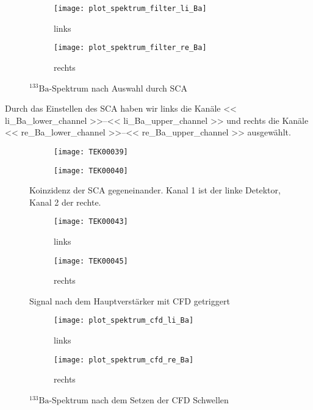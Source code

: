 \documentclass[11pt, ngerman, fleqn, DIV=15, headinclude, BCOR=2cm]{scrreprt}
\begin{document}
\begin{figure}
	\centering
	\begin{subfigure}{0.49 \textwidth}
		\texttt{[image: plot\_spektrum\_filter\_li\_Ba]}
		\caption{%
			links
		}
		\label{fig:ba_slow_sca_eingestellt-li_plot}
	\end{subfigure}
	\begin{subfigure}{0.49 \textwidth}
		\texttt{[image: plot\_spektrum\_filter\_re\_Ba]}
		\caption{%
			rechts
		}
		\label{fig:ba_slow_sca_eingestellt-re_plot}
	\end{subfigure}
	\caption{%
		$^{133}\text{Ba}$-Spektrum nach Auswahl durch SCA
	}
	\label{fig:ba_slow_signal_sca_eingestellt_plot}
\end{figure}

Durch das Einstellen des SCA haben wir links die Kanäle
\numrange{<< li_Ba_lower_channel >>}{<< li_Ba_upper_channel >>} und rechts
die Kanäle
\numrange{<< re_Ba_lower_channel >>}{<< re_Ba_upper_channel >>} ausgewählt.


\begin{figure}
	\centering
	\begin{subfigure}{0.49 \textwidth}
		\texttt{[image: TEK00039]}
	\end{subfigure}
	\begin{subfigure}{0.49 \textwidth}
		\texttt{[image: TEK00040]}
	\end{subfigure}
	\caption{%
		Koinzidenz der SCA gegeneinander. Kanal 1 ist der linke
		Detektor, Kanal 2 der rechte.
	}
	\label{fig:ba_slow_signal_sca_koinzidenz}
\end{figure}



\begin{figure}
	\centering
	\begin{subfigure}{0.49 \textwidth}
		\texttt{[image: TEK00043]}
		\caption{%
			links
		}
		\label{fig:ba_fast_signal_cfd_trig-li}
	\end{subfigure}
	\begin{subfigure}{0.49 \textwidth}
		\texttt{[image: TEK00045]}
		\caption{%
			rechts
		}
		\label{fig:ba_fast_signal_cfd_trig-re}
	\end{subfigure}
	\caption{%
		Signal nach dem Hauptverstärker mit CFD getriggert
	}
	\label{fig:ba_fast_signal_cfd_trig}
\end{figure}

\begin{figure}
	\centering
	\begin{subfigure}{0.49 \textwidth}
		\texttt{[image: plot\_spektrum\_cfd\_li\_Ba]}
		\caption{%
			links
		}
		\label{fig:ba_fast_signal_cfd_plot-li}
	\end{subfigure}
	\begin{subfigure}{0.49 \textwidth}
		\texttt{[image: plot\_spektrum\_cfd\_re\_Ba]}
		\caption{%
			rechts
		}
		\label{fig:ba_fast_signal_cfd_plot-re}
	\end{subfigure}
	\caption{%
		$^{133}\text{Ba}$-Spektrum nach dem Setzen der CFD Schwellen
	}
	\label{fig:ba_fast_signal_cfd_plot}
\end{figure}
\end{document}
